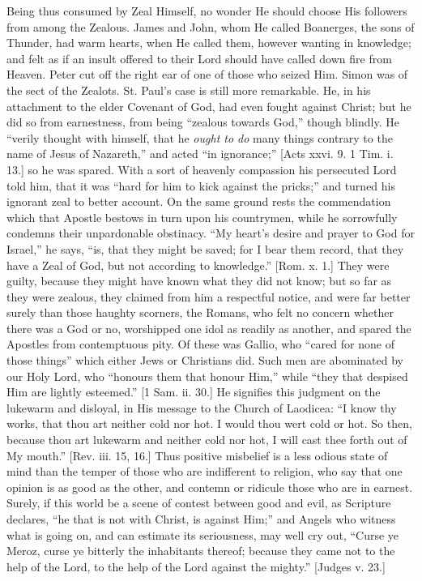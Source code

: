 Being thus consumed by Zeal Himself, no wonder He should choose His
followers from among the Zealous. James and John, whom He called
Boanerges, the sons of Thunder, had warm hearts, when He called them,
however wanting in knowledge; and felt as if an insult offered to their
Lord should have called down fire from Heaven. Peter cut off the right
ear of one of those who seized Him. Simon was of the sect of the
Zealots. St. Paul's case is still more remarkable. He, in his attachment
to the elder Covenant of God, had even fought against Christ; but he did
so from earnestness, from being ``zealous towards God,'' though
blindly. He ``verily thought with himself, that he \emph{ought to do}
many things contrary to the name of Jesus of Nazareth,'' and acted
``in ignorance;'' [Acts xxvi. 9. 1 Tim. i. 13.] so he was spared.
With a sort of heavenly compassion his persecuted Lord told him, that it
was ``hard for him to kick against the pricks;'' and turned his
ignorant zeal to better account. On the same ground rests the
commendation which that Apostle bestows in turn upon his countrymen,
while he sorrowfully condemns their unpardonable obstinacy. ``My
heart's desire and prayer to God for Israel,'' he says, ``is,
that they might be saved; for I bear them record, that they have a Zeal
of God, but not according to knowledge.'' [Rom. x. 1.] They were
guilty, because they might have known what they did not know; but so far
as they were zealous, they claimed from him a respectful notice, and
were far better surely than those haughty scorners, the Romans, who felt
no concern whether there was a God or no, worshipped one idol as readily
as another, and spared the Apostles from contemptuous pity. Of these was
Gallio, who ``cared for none of those things'' which either Jews
or Christians did. Such men are abominated by our Holy Lord, who
``honours them that honour Him,'' while ``they that despised
Him are lightly esteemed.'' [1 Sam. ii. 30.] He signifies this
judgment on the lukewarm and disloyal, in His message to the Church of
Laodicea: ``I know thy works, that thou art neither cold nor hot. I
would thou wert cold or hot. So then, because thou art lukewarm and
neither cold nor hot, I will cast thee forth out of My mouth.''
[Rev. iii. 15, 16.] Thus positive misbelief is a less odious state of
mind than the temper of those who are indifferent to religion, who say
that one opinion is as good as the other, and contemn or ridicule those
who are in earnest. Surely, if this world be a scene of contest between
good and evil, as Scripture declares, ``he that is not with Christ,
is against Him;'' and Angels who witness what is going on, and can
estimate its seriousness, may well cry out, ``Curse ye Meroz, curse
ye bitterly the inhabitants thereof; because they came not to the help
of the Lord, to the help of the Lord against the mighty.'' [Judges
v. 23.]

